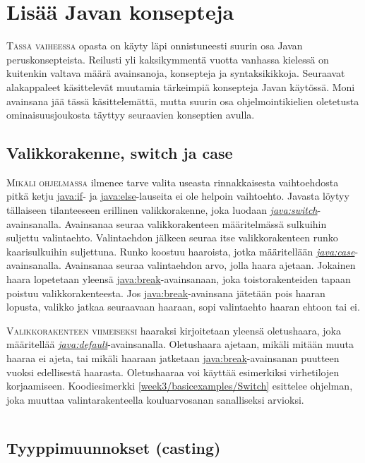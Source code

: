 \documentclass[openany]{book}
\newcommand{\newthought}[1]{\smallskip\textsc{#1}}
\newcommand{\java}[1]{\underline{\gls{java:#1}}}
\newcommand{\newjava}[1]{\textit{\java{#1}}}
\newcommand{\code}[3]{
	\begin{listing}
		\linespread{0.85}
		\inputminted{java}{OhjelmointiopasEsimerkit/src/#1/#2.java}
		\caption{#1: #3}
		\label{#1/#2}
	\end{listing}
}
\begin{document}
\section{Lisää Javan konsepteja}
\label{loput perusteet}

\newthought{Tässä vaiheessa} opasta on käyty läpi onnistuneesti suurin osa Javan
peruskonsepteista. Reilusti yli kaksikymmentä vuotta vanhassa kielessä on kuitenkin valtava määrä
avainsanoja, konsepteja ja syntaksikikkoja. Seuraavat alakappaleet käsittelevät muutamia
tärkeimpiä konsepteja Javan käytössä. Moni avainsana jää tässä käsittelemättä, mutta suurin osa
ohjelmointikielien oletetusta ominaisuusjoukosta täyttyy seuraavien konseptien avulla.

\subsection{Valikkorakenne, switch ja case}
\label{switch}

\newthought{Mikäli ohjelmassa} ilmenee tarve valita useasta rinnakkaisesta vaihtoehdosta pitkä
ketju \java{if}- ja \java{else}-lauseita ei ole helpoin vaihtoehto. Javasta löytyy tällaiseen
tilanteeseen erillinen valikkorakenne, joka luodaan \newjava{switch}-avainsanalla. Avainsanaa
seuraa valikkorakenteen määritelmässä sulkuihin suljettu valintaehto. Valintaehdon jälkeen
seuraa itse valikkorakenteen runko kaarisulkuihin suljettuna. Runko koostuu haaroista, jotka
määritellään \newjava{case}-avainsanalla. Avainsanaa seuraa valintaehdon arvo, jolla haara
ajetaan. Jokainen haara lopetetaan yleensä \java{break}-avainsanaan, joka toistorakenteiden
tapaan poistuu valikkorakenteesta. Jos \java{break}-avainsana jätetään pois haaran lopusta,
valikko jatkaa seuraavaan haaraan, sopi valintaehto haaran ehtoon tai ei.

\newthought{Valikkorakenteen viimeiseksi} haaraksi kirjoitetaan yleensä oletushaara, joka
määritellää \newjava{default}-avainsanalla. Oletushaara ajetaan, mikäli mitään muuta haaraa ei
ajeta, tai mikäli haaraan jatketaan \java{break}-avainsanan puutteen vuoksi edellisestä haarasta.
Oletushaaraa voi käyttää esimerkiksi virhetilojen korjaamiseen. Koodiesimerkki
\ref{week3/basicexamples/Switch} esittelee ohjelman, joka muuttaa valintarakenteella
kouluarvosanan sanalliseksi arvioksi.

\code{week3/basicexamples}{Switch}{Valikkorakenne, \java{switch}- ja \java{case} -avainsanojen
käyttö Javassa}

\subsection{Tyyppimuunnokset (casting)}
\label{casting}
\end{document}
